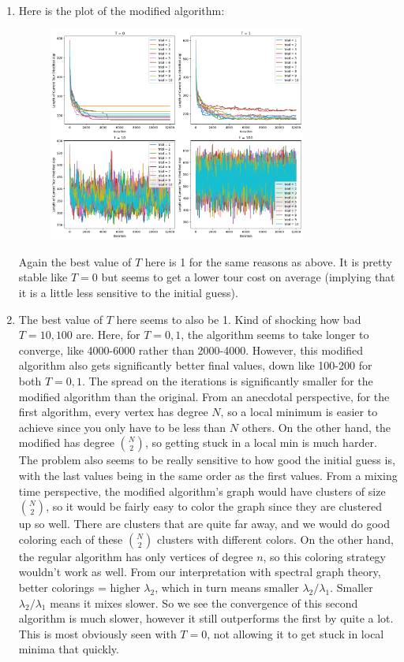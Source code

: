 \documentclass[12pt]{article}
\begin{document}
\begin{enumerate}[label=(\alph*)]
        \item Here is the plot of the modified algorithm:
        \begin{figure}[H]
            \centering
            \includegraphics[width=0.8\textwidth]{modified_alg.png}
        \end{figure}

        Again the best value of $T$ here is 1 for the same reasons as above. It is pretty stable like $T=0$ but seems to get a lower tour cost on average (implying that it is a little less sensitive to the initial guess). 

        \item The best value of $T$ here seems to also be 1. Kind of shocking how bad $T=10,100$ are. Here, for $T=0,1$, the algorithm seems to take longer to converge, like 4000-6000 rather than 2000-4000. However, this modified algorithm also gets significantly better final values, down like 100-200 for both $T=0,1$. The spread on the iterations is significantly smaller for the modified algorithm than the original. From an anecdotal perspective, for the first algorithm, every vertex has degree $N$, so a local minimum is easier to achieve since you only have to be less than $N$ others. On the other hand, the modified has degree $N \choose 2$, so getting stuck in a local min is much harder. The problem also seems to be really sensitive to how good the initial guess is, with the last values being in the same order as the first values. From a mixing time perspective, the modified algorithm's graph would have clusters of size $N \choose 2$, so it would be fairly easy to color the graph since they are clustered up so well. There are clusters that are quite far away, and we would do good coloring each of these $N \choose 2$ clusters with different colors. On the other hand, the regular algorithm has only vertices of degree $n$, so this coloring strategy wouldn't work as well. From our interpretation with spectral graph theory, better colorings = higher $\lambda_2$, which in turn means smaller $\lambda_2/\lambda_1$. Smaller $\lambda_2/\lambda_1$ means it mixes slower. So we see the convergence of this second algorithm is much slower, however it still outperforms the first by quite a lot. This is most obviously seen with $T=0$, not allowing it to get stuck in local minima that quickly. 
        

\end{enumerate}
\end{document}
